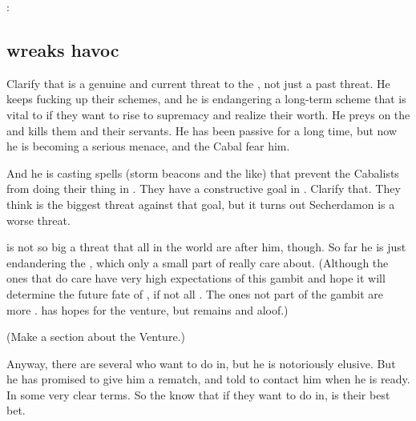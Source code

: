 \Teshrial: 









\subsection{\Ishnaruchaefir wreaks havoc}
Clarify that \Ishnaruchaefir is a genuine and current threat to the \resphain, not just a past threat.
He keeps fucking up their schemes, and he is endangering a long-term scheme that is vital to \CiriathSepher if they want to rise to supremacy and realize their worth.
He preys on the \resphain and kills them and their servants. 
He has been passive for a long time, but now he is becoming a serious menace, and the Cabal fear him.

And he is casting spells (storm beacons and the like) that prevent the Cabalists from doing their thing in \Malcur.
They have a constructive goal in \Malcur. 
Clarify that.
They think \Ishnaruchaefir is the biggest threat against that goal, but it turns out Secherdamon is a worse threat. 

\Ishnaruchaefir is not so big a threat that all \resphain in the world are after him, though.
So far he is just endandering the , which only a small part of \CiriathSepher really care about. 
(Although the ones that do care have very high expectations of this gambit and hope it will determine the future fate of \CiriathSepher, if not all \resphain. 
 The ones not part of the gambit are more \skeptical. 
 \Azraid has hopes for the venture, but remains \skeptical and aloof.)

(Make a section about the \CiriathSepher \Malcur Venture.)

Anyway, there are several \resphain who want to do \Ishnaruchaefir in, but he is notoriously elusive.
But he has promised \Teshrial to give him a rematch, and told \Teshrial to contact him when he is ready.
In some very clear terms.
So the \resphain know that if they want to do \Ishnaruchaefir in, \Teshrial is their best bet.





